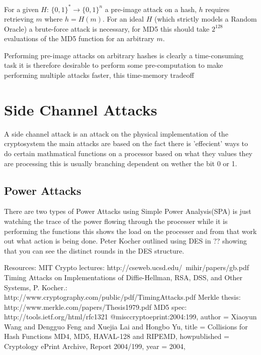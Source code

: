 \documentclass[a4paper,12pt]{article}
\begin{document}
For a given $H$: $\{0,1\}^* \rightarrow \{0,1\}^n$ a pre-image attack on a hash, $h$ requires retrieving $m$ where $h = H(m)$. For an ideal $H$ (which strictly models a Random Oracle) a brute-force attack is necessary, for MD5 this should take $2^{128}$ evaluations of the MD5 function for an arbitrary $m$.

Performing pre-image attacks on arbitrary hashes is clearly a time-consuming task it is therefore desirable to perform some pre-computation to make performing multiple attacks faster, this time-memory tradeoff 



\section{Side Channel Attacks}
A side channel attack is an attack on the physical implementation of the cryptosystem the main attacks are based on the fact there is 'effecient' ways to do certain mathmatical functions on a processor based on what they values they are processing this is usually branching dependent on wether the bit 0 or 1. 

\subsection{Power Attacks}
There are two types of Power Attacks using Simple Power Analysis(SPA) is just watching the trace of the power flowing through the processer while it is performing the functions this shows the load on the processer and from that work out what action is being done. Peter Kocher outlined using DES in ?? showing that you can see the distinct rounds in the DES structure. 

Resources:
MIT Crypto lectures: http://cseweb.ucsd.edu/~mihir/papers/gb.pdf
Timing Attacks on Implementations of Diffie-Hellman, RSA, DSS, and Other Systems, P. Kocher.: http://www.cryptography.com/public/pdf/TimingAttacks.pdf
Merkle thesis: http://www.merkle.com/papers/Thesis1979.pdf 
MD5 spec: http://tools.ietf.org/html/rfc1321 
@misc{cryptoeprint:2004:199,
    author = {Xiaoyun Wang  and Dengguo Feng and Xuejia Lai and Hongbo Yu},
    title = {Collisions for Hash Functions MD4, MD5, HAVAL-128 and RIPEMD},
    howpublished = {Cryptology ePrint Archive, Report 2004/199},
    year = {2004},
}
\end{document}
